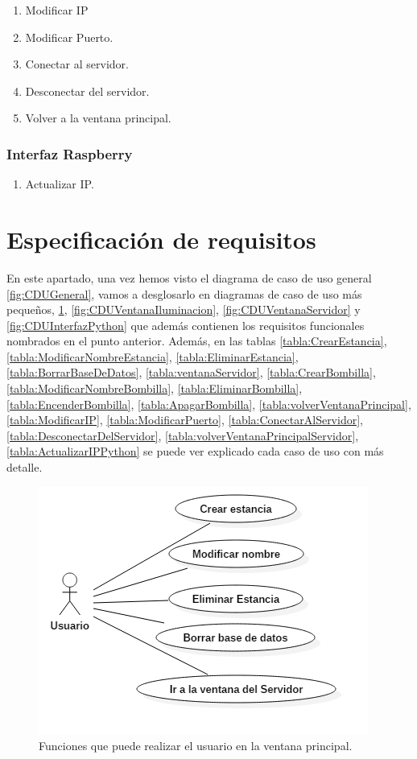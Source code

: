 \begin{enumerate}
	\item Modificar IP
	\item Modificar Puerto.
	\item Conectar al servidor.
	\item Desconectar del servidor.
	\item Volver a la ventana principal.
\end{enumerate}

\subsubsection{Interfaz Raspberry}

\begin{enumerate}
	\item Actualizar IP.
\end{enumerate}

\section{Especificación de requisitos}

En este apartado, una vez hemos visto el diagrama de caso de uso general \ref{fig:CDUGeneral}, vamos a desglosarlo en diagramas de caso de uso más pequeños, \ref{fig:CDUVentanaPrincipal}, \ref{fig:CDUVentanaIluminacion}, \ref{fig:CDUVentanaServidor} y \ref{fig:CDUInterfazPython} que además contienen los requisitos funcionales nombrados en el punto anterior. Además, en las tablas \ref{tabla:CrearEstancia}, \ref{tabla:ModificarNombreEstancia}, \ref{tabla:EliminarEstancia}, \ref{tabla:BorrarBaseDeDatos}, \ref{tabla:ventanaServidor}, \ref{tabla:CrearBombilla}, \ref{tabla:ModificarNombreBombilla}, \ref{tabla:EliminarBombilla}, \ref{tabla:EncenderBombilla}, \ref{tabla:ApagarBombilla}, \ref{tabla:volverVentanaPrincipal}, \ref{tabla:ModificarIP}, \ref{tabla:ModificarPuerto}, \ref{tabla:ConectarAlServidor}, \ref{tabla:DesconectarDelServidor}, \ref{tabla:volverVentanaPrincipalServidor}, \ref{tabla:ActualizarIPPython} se puede ver explicado cada caso de uso con más detalle.

\newpage

\begin{figure}[h!]
	\centering
	\includegraphics[width=0.7\linewidth]{img/CDUVentanaPrincipal}
	\caption{Funciones que puede realizar el usuario en la ventana principal.}
	\label{fig:CDUVentanaPrincipal}
\end{figure}

